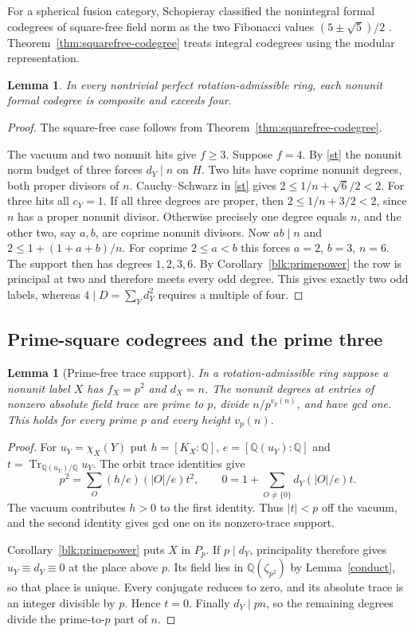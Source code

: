 \documentclass[11pt]{amsart}
\numberwithin{equation}{section}
\newtheorem{lemma}[theorem]{Lemma}
\theoremstyle{definition}
\theoremstyle{plain}
\DeclareMathOperator{\Tr}{Tr}
\newcommand{\QQ}{\mathbb Q}
\begin{document}
For a spherical fusion category, Schopieray classified the
nonintegral formal codegrees of square-free field norm as the two
Fibonacci values $(5\pm\sqrt5)/2$ \cite[Theorem~4.13]{SchopFormal}.
Theorem~\ref{thm:squarefree-codegree} treats integral codegrees
using the modular representation.

\begin{lemma}\label{small}
In every nontrivial perfect rotation-admissible ring, each nonunit formal
codegree is composite and exceeds four.
\end{lemma}
\begin{proof}
The square-free case follows from Theorem~\ref{thm:squarefree-codegree}.

The vacuum and two nonunit hits give $f\ge3$. Suppose $f=4$.
By \eqref{st} the nonunit norm budget of three forces $d_Y\mid n$
on $H$. Two hits have coprime nonunit degrees, both proper divisors
of $n$. Cauchy--Schwarz in \eqref{st} gives
$2\le 1/n+\sqrt6/2<2$. For three hits all $c_Y=1$.
If all three degrees are proper, then $2\le1/n+3/2<2$, since $n$ has
a proper nonunit divisor. Otherwise precisely one degree equals $n$,
and the other two, say $a,b$, are coprime nonunit divisors. Now
$ab\mid n$ and $2\le1+(1+a+b)/n$. For coprime $2\le a<b$ this forces
$a=2$, $b=3$, $n=6$. The support then has degrees $1,2,3,6$.
By Corollary~\ref{blk:primepower} the row is principal at two and
therefore meets every odd degree. This gives exactly two odd labels,
whereas $4\mid D=\sum_Yd_Y^2$ requires a multiple of four.
\end{proof}

\subsection{Prime-square codegrees and the prime three}
\begin{lemma}[Prime-free trace support]\label{prime-square}
In a rotation-admissible ring suppose a nonunit label $X$ has
$f_X=p^2$ and $d_X=n$. The nonunit degrees at entries of nonzero
absolute field trace are prime to $p$, divide $n/p^{v_p(n)}$,
and have gcd one. This holds for every prime $p$ and every height
$v_p(n)$.
\end{lemma}
\begin{proof}
For $u_Y=\chi_X(Y)$ put $h=[K_X:\QQ]$, $e=[\QQ(u_Y):\QQ]$ and $t=\Tr_{\QQ(u_Y)/\QQ}u_Y$. The orbit trace identities \cite[Lemma~2.4, equations~(2.4)--(2.5)]{BDPcore} give
\[
 p^2=\sum_O(h/e)(|O|/e)t^2,\qquad 0=1+\sum_{O\ne\{0\}}d_Y(|O|/e)t.
\]
The vacuum contributes $h>0$ to the first identity. Thus $|t|<p$
off the vacuum, and the second identity gives gcd one on its
nonzero-trace support.

Corollary~\ref{blk:primepower} puts $X$ in $P_p$. If $p\mid d_Y$,
principality therefore gives $u_Y\equiv d_Y\equiv0$ at the place
above $p$. Its field lies in $\QQ(\zeta_{p^2})$ by Lemma~\ref{conduct},
so that place is unique. Every conjugate reduces to zero, and its
absolute trace is an integer divisible by $p$. Hence $t=0$.
Finally $d_Y\mid pn$, so the remaining degrees divide the prime-to-$p$
part of $n$.
\end{proof}
\end{document}

